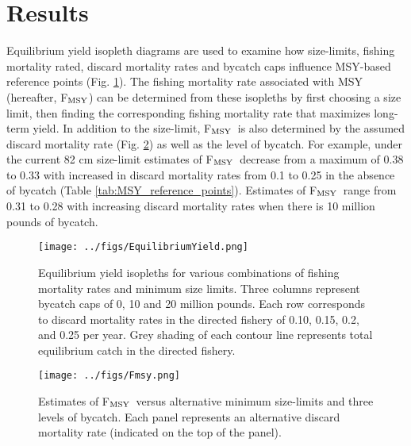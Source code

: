 \documentclass[12pt,leqno]{article}
\newcommand{\fmsy}{F$_{\textnormal{MSY}}$}
\begin{document}
\section*{Results}

Equilibrium yield isopleth diagrams are used to examine how size-limits, fishing mortality rated, discard mortality rates and bycatch caps influence MSY-based reference points (Fig. \ref{fig:EquilibriumYield}).  The fishing mortality rate associated with MSY (hereafter, \fmsy) can be determined from these isopleths by first choosing a size limit, then finding the corresponding fishing mortality rate that maximizes long-term yield.  In addition to the size-limit, \fmsy\ is also  determined by the assumed discard mortality rate (Fig. \ref{fig:Fmsy}) as well as the level of bycatch.  For example, under the current 82 cm size-limit estimates of \fmsy\ decrease from a maximum of 0.38 to 0.33 with increased in discard mortality rates from 0.1 to 0.25 in the absence of bycatch (Table \ref{tab:MSY_reference_points}). Estimates of \fmsy\ range from 0.31 to 0.28 with increasing discard mortality rates when there is 10 million pounds of bycatch. 

\begin{figure}
	\texttt{[image: ../figs/EquilibriumYield.png]}
	\caption{Equilibrium yield isopleths for various combinations of fishing mortality rates and minimum size limits. Three columns represent bycatch caps of 0, 10 and 20 million pounds. Each row corresponds to discard mortality rates in the directed fishery of 0.10, 0.15, 0.2, and 0.25 per year.  Grey shading of each contour line represents total equilibrium catch in the directed fishery. }\label{fig:EquilibriumYield}
\end{figure}

\begin{figure}
	\texttt{[image: ../figs/Fmsy.png]}
	\caption{Estimates of \fmsy\ versus alternative minimum size-limits and three levels of bycatch. Each panel represents an alternative discard mortality rate (indicated on the top of the panel).}\label{fig:Fmsy}
\end{figure}
\end{document}
